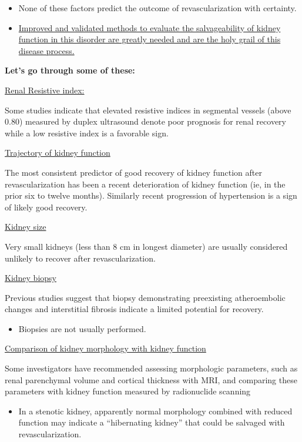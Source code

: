 \documentclass[
]{book}
\providecommand{\tightlist}{%
  \setlength{\itemsep}{0pt}\setlength{\parskip}{0pt}}
\begin{document}
\begin{itemize}
\item
  None of these factors predict the outcome of revascularization with
  certainty.
\item
  \uline{Improved and validated methods to evaluate the salvageability of
  kidney function in this disorder are greatly needed and are the holy
  grail of this disease process.}
\end{itemize}

\textbf{Let's go through some of these:}

\uline{Renal Resistive index:}

Some studies indicate that elevated resistive indices in segmental
vessels (above 0.80) measured by duplex ultrasound denote poor prognosis
for renal recovery while a low resistive index is a favorable sign.

\uline{Trajectory of kidney function}

The most consistent predictor of good recovery of kidney function after
revascularization has been a recent deterioration of kidney function
(ie, in the prior six to twelve months). Similarly recent progression of
hypertension is a sign of likely good recovery.

\uline{Kidney size}

Very small kidneys (less than 8 cm in longest diameter) are usually
considered unlikely to recover after revascularization.

\uline{Kidney biopsy}

Previous studies suggest that biopsy demonstrating preexisting
atheroembolic changes and interstitial fibrosis indicate a limited
potential for recovery.

\begin{itemize}
\tightlist
\item
  Biopsies are not usually performed.
\end{itemize}

\uline{Comparison of kidney morphology with kidney function}

Some investigators have recommended assessing morphologic parameters,
such as renal parenchymal volume and cortical thickness with MRI, and
comparing these parameters with kidney function measured by radionuclide
scanning

\begin{itemize}
\tightlist
\item
  In a stenotic kidney, apparently normal morphology combined with
  reduced function may indicate a ``hibernating kidney'' that could be
  salvaged with revascularization.
\end{itemize}
\end{document}
